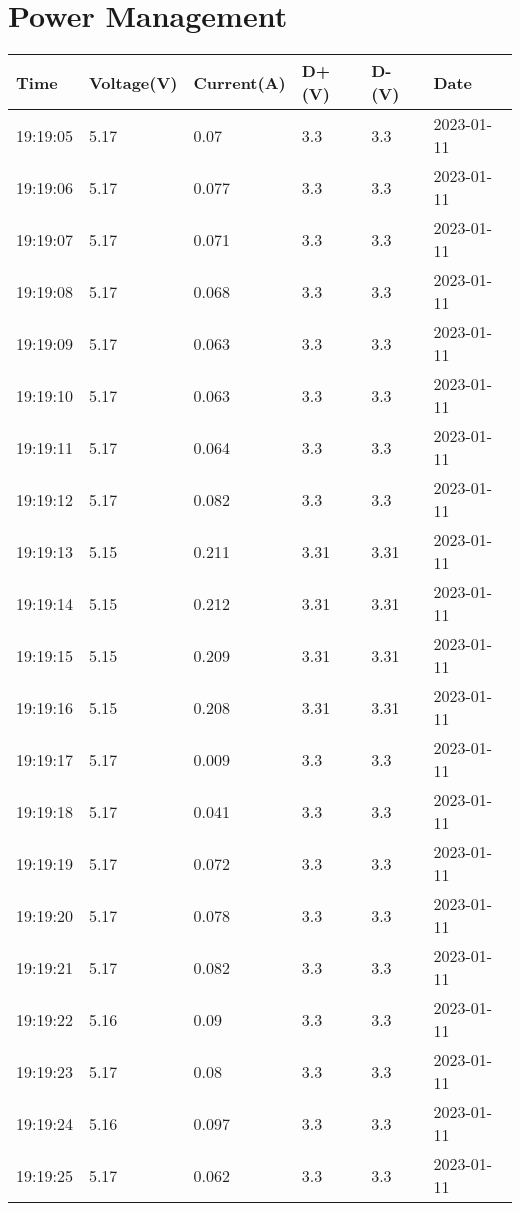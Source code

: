 \chapter{Power Management}\label{lst:power-management}
\begin{longtable}{|l|l|l|l|l|l|}
    \hline
        Time & Voltage(V) & Current(A) & D+(V) & D-(V) & Date \\ \hline
        19:19:05 & 5.17 & 0.07 & 3.3 & 3.3 & 2023-01-11 \\ \hline
        19:19:06 & 5.17 & 0.077 & 3.3 & 3.3 & 2023-01-11 \\ \hline
        19:19:07 & 5.17 & 0.071 & 3.3 & 3.3 & 2023-01-11 \\ \hline
        19:19:08 & 5.17 & 0.068 & 3.3 & 3.3 & 2023-01-11 \\ \hline
        19:19:09 & 5.17 & 0.063 & 3.3 & 3.3 & 2023-01-11 \\ \hline
        19:19:10 & 5.17 & 0.063 & 3.3 & 3.3 & 2023-01-11 \\ \hline
        19:19:11 & 5.17 & 0.064 & 3.3 & 3.3 & 2023-01-11 \\ \hline
        19:19:12 & 5.17 & 0.082 & 3.3 & 3.3 & 2023-01-11 \\ \hline
        19:19:13 & 5.15 & 0.211 & 3.31 & 3.31 & 2023-01-11 \\ \hline
        19:19:14 & 5.15 & 0.212 & 3.31 & 3.31 & 2023-01-11 \\ \hline
        19:19:15 & 5.15 & 0.209 & 3.31 & 3.31 & 2023-01-11 \\ \hline
        19:19:16 & 5.15 & 0.208 & 3.31 & 3.31 & 2023-01-11 \\ \hline
        19:19:17 & 5.17 & 0.009 & 3.3 & 3.3 & 2023-01-11 \\ \hline
        19:19:18 & 5.17 & 0.041 & 3.3 & 3.3 & 2023-01-11 \\ \hline
        19:19:19 & 5.17 & 0.072 & 3.3 & 3.3 & 2023-01-11 \\ \hline
        19:19:20 & 5.17 & 0.078 & 3.3 & 3.3 & 2023-01-11 \\ \hline
        19:19:21 & 5.17 & 0.082 & 3.3 & 3.3 & 2023-01-11 \\ \hline
        19:19:22 & 5.16 & 0.09 & 3.3 & 3.3 & 2023-01-11 \\ \hline
        19:19:23 & 5.17 & 0.08 & 3.3 & 3.3 & 2023-01-11 \\ \hline
        19:19:24 & 5.16 & 0.097 & 3.3 & 3.3 & 2023-01-11 \\ \hline
        19:19:25 & 5.17 & 0.062 & 3.3 & 3.3 & 2023-01-11 \\ \hline

\end{longtable}

